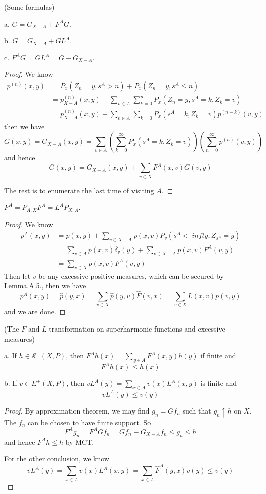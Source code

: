 \documentclass[lang=en,11pt,a4paper,citestyle =authoryear]{elegantpaper}
\newcommand{\Sar}{\mathcal{S}}
\begin{document}
\begin{lemma}(Some formulas)\par
    a. $G = G_{X-A}+F^AG$.\par
    b. $G = G_{X-A} + GL^A$.\par
    c. $F^AG = GL^A  = G-G_{X-A}$.
\end{lemma}
\begin{proof}
    We know
    \[
    \begin{aligned}
    p^{(n)}(x,y) &= P_x(Z_n = y, s^A>n)+P_x(Z_n = y, s^A \leq n)\\
    &= p_{X-A}^{(n)}(x,y) + \sum_{v\in A}\sum\limits_{k=0}^n P_x(Z_n = y, s^A = k, Z_k = v) \\
    & = p_{X-A}^{(n)}(x,y) + \sum_{v\in A}\sum\limits_{k=0}P_x(s^A = k,Z_k = v)p^{(n-k)}(v,y)
    \end{aligned}
    \]
    then we have
    \[
    G(x,y) = G_{X-A}(x,y) = \sum\limits_{v\in A}(\sum\limits_{k=0}^{\infty}P_x(s^A = k, Z_k = v))(\sum\limits_{n=0}^{\infty} p^{(n)}(v,y))
    \]
    and hence
    \[
    G(x,y) = G_{X-A}(x,y) + \sum\limits_{v\in X}F^A(x,v)G(v,y)
    \]\par 
    The rest is to enumerate the last time of visiting $A$.
\end{proof}

\begin{lemma}
    $P^A = P_{A,X}F^A = L^AP_{X,A}$.
\end{lemma}
\begin{proof}
    We know
    \[
    \begin{aligned}
        p^A(x,y) &= p(x,y) + \sum_{v\in X-A}p(x,v)P_v(s^A<|infty, Z_{s^A} = y) \\
        &=\sum\limits_{v\in A}p(x,v)\delta_v(y) + \sum\limits_{v\in X-A}p(x,v)F^A(v,y) \\
        &= \sum\limits_{v\in X}p(x,v)F^A(v,y)
    \end{aligned}
    \]
    Then let $v$ be any excessive positive measures, which can be secured by Lemma.A.5., then we have
    \[
    p^A(x,y) = \hat{p}(y,x) = \sum_{v\in X}\hat{p}(y,v)\hat{F}(v,x) = \sum\limits_{v\in X} L(x,v)p(v,y) 
    \]
    and we are done.
\end{proof}

\begin{lemma}(The $F$ and $L$ transformation on superharmonic functions and excessive measures)\par
    a. If $h\in\Sar^+(X,P)$, then $F^Ah(x) = \sum_{y\in A} F^A(x,y)h(y)$ if finite and
    \[F^Ah(x) \leq h(x)\]\par
    b. If $v\in E^+(X,P)$, then $vL^A(y) = \sum_{x\in A}v(x)L^A(x,y)$ is finite and
    \[vL^A(y) \leq v(y)\]
\end{lemma}
\begin{proof}
    By approximation theorem, we may find $g_n = Gf_n$ such that $g_n \uparrow h$ on $X$. The $f_n$ can be chosen to have finite support. So
    \[
    F^Ag_n = F^AGf_n = Gf_n - G_{X-A}f_n \leq g_n \leq h
    \]
    and hence $F^Ah \leq h$ by MCT.\par
    For the other conclusion, we know 
    \[
    vL^A(y) = \sum_{x\in A}v(x)L^A(x,y) = \sum_{x\in A}\hat{F}^A(y,x)v(y) \leq v(y)
    \]
\end{proof}
\end{document}

